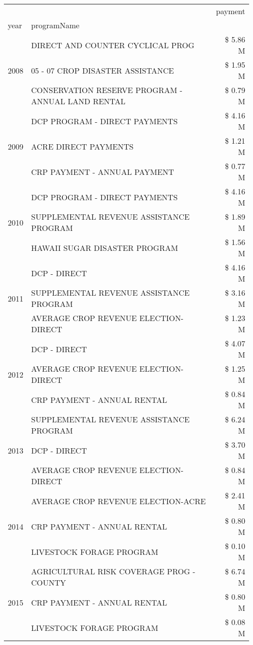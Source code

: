 \begin{tabular}{llr}
\toprule
 &  & payment \\
year & programName &  \\
\midrule
\multirow[t]{3}{*}{2008} & DIRECT AND COUNTER CYCLICAL PROG & \$ 5.86 M \\
 & 05 - 07 CROP DISASTER ASSISTANCE & \$ 1.95 M \\
 & CONSERVATION RESERVE PROGRAM - ANNUAL LAND RENTAL & \$ 0.79 M \\
\cline{1-3}
\multirow[t]{3}{*}{2009} & DCP PROGRAM - DIRECT PAYMENTS & \$ 4.16 M \\
 & ACRE DIRECT PAYMENTS & \$ 1.21 M \\
 & CRP PAYMENT - ANNUAL PAYMENT & \$ 0.77 M \\
\cline{1-3}
\multirow[t]{3}{*}{2010} & DCP PROGRAM - DIRECT PAYMENTS & \$ 4.16 M \\
 & SUPPLEMENTAL REVENUE ASSISTANCE PROGRAM & \$ 1.89 M \\
 & HAWAII SUGAR DISASTER PROGRAM & \$ 1.56 M \\
\cline{1-3}
\multirow[t]{3}{*}{2011} & DCP - DIRECT & \$ 4.16 M \\
 & SUPPLEMENTAL REVENUE ASSISTANCE PROGRAM & \$ 3.16 M \\
 & AVERAGE CROP REVENUE ELECTION-DIRECT & \$ 1.23 M \\
\cline{1-3}
\multirow[t]{3}{*}{2012} & DCP - DIRECT & \$ 4.07 M \\
 & AVERAGE CROP REVENUE ELECTION-DIRECT & \$ 1.25 M \\
 & CRP PAYMENT - ANNUAL RENTAL & \$ 0.84 M \\
\cline{1-3}
\multirow[t]{3}{*}{2013} & SUPPLEMENTAL REVENUE ASSISTANCE PROGRAM & \$ 6.24 M \\
 & DCP - DIRECT & \$ 3.70 M \\
 & AVERAGE CROP REVENUE ELECTION-DIRECT & \$ 0.84 M \\
\cline{1-3}
\multirow[t]{3}{*}{2014} & AVERAGE CROP REVENUE ELECTION-ACRE & \$ 2.41 M \\
 & CRP PAYMENT - ANNUAL RENTAL & \$ 0.80 M \\
 & LIVESTOCK FORAGE PROGRAM & \$ 0.10 M \\
\cline{1-3}
\multirow[t]{3}{*}{2015} & AGRICULTURAL RISK COVERAGE PROG - COUNTY & \$ 6.74 M \\
 & CRP PAYMENT - ANNUAL RENTAL & \$ 0.80 M \\
 & LIVESTOCK FORAGE PROGRAM & \$ 0.08 M \\

\end{tabular}
